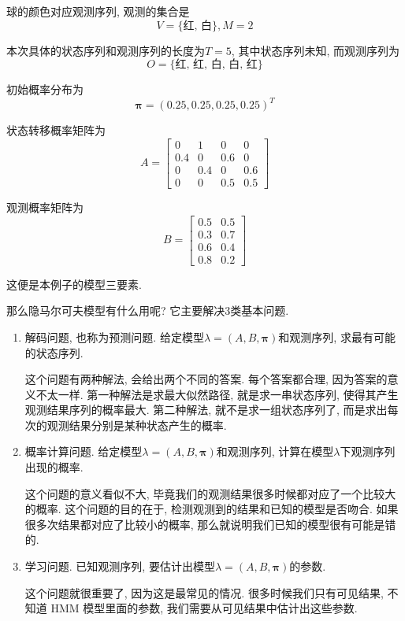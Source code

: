 \documentclass[a4paper,UTF8]{ctexart}
\theoremstyle{plain} \newtheorem{theorem}{定理}[section]
\theoremstyle{plain} \newtheorem{definition}{定义}[section]
\theoremstyle{plain} \newtheorem{lemma}{引理}[section]
\theoremstyle{plain} \newtheorem{proposition}{命题}[section]
\theoremstyle{plain} \newtheorem{example}{例}[section]
\theoremstyle{plain} \newtheorem{remark}{注}[section]
\theoremstyle{plain} \newtheorem{corollary}{推论}[section]
\begin{document}
球的颜色对应观测序列, 观测的集合是
\begin{equation*}
V = \{\textrm{红, 白}\}, M = 2
\end{equation*}

本次具体的状态序列和观测序列的长度为$T = 5$, 其中状态序列未知, 而观测序列为
\begin{equation*}
O = \{\textrm{红, 红, 白, 白, 红}\}
\end{equation*}

初始概率分布为
\begin{equation*}
\bm{\pi} = (0.25, 0.25, 0.25, 0.25)^{T}
\end{equation*}

状态转移概率矩阵为
$$
A = 
\begin{bmatrix}
0 & 1 & 0 & 0 \\ 
0.4 & 0 & 0.6 & 0 \\ 
0 & 0.4 & 0 & 0.6 \\ 
0 & 0 & 0.5 & 0.5
\end{bmatrix}
$$

观测概率矩阵为
$$
B = 
\begin{bmatrix}
0.5 & 0.5 \\ 
0.3 & 0.7 \\ 
0.6 & 0.4 \\ 
0.8 & 0.2 
\end{bmatrix}
$$

这便是本例子的模型三要素.

那么隐马尔可夫模型有什么用呢? 它主要解决$3$类基本问题.
\begin{enumerate}[(1)]
\item 解码问题, 也称为预测问题. 给定模型$\lambda = (A, B, \bm{\pi})$和观测序列, 求最有可能的状态序列. 

这个问题有两种解法, 会给出两个不同的答案. 每个答案都合理, 因为答案的意义不太一样.
第一种解法是求最大似然路径, 就是求一串状态序列, 使得其产生观测结果序列的概率最大. 第二种解法, 就不是求一组状态序列了, 而是求出每次的观测结果分别是某种状态产生的概率.

\item 概率计算问题. 给定模型$\lambda = (A, B, \bm{\pi})$和观测序列, 计算在模型$\lambda$下观测序列出现的概率.

这个问题的意义看似不大, 毕竟我们的观测结果很多时候都对应了一个比较大的概率. 这个问题的目的在于, 检测观测到的结果和已知的模型是否吻合. 如果很多次结果都对应了比较小的概率, 那么就说明我们已知的模型很有可能是错的.

\item 学习问题. 已知观测序列, 要估计出模型$\lambda = (A, B, \bm{\pi})$的参数.

这个问题就很重要了, 因为这是最常见的情况. 很多时候我们只有可见结果, 不知道 HMM 模型里面的参数, 我们需要从可见结果中估计出这些参数.

\end{enumerate}
\end{document}
